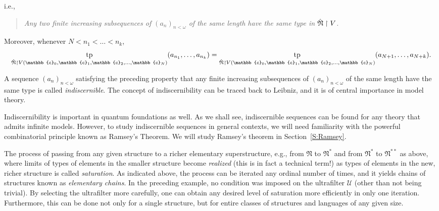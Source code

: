 \documentclass{scrartcl}
\DeclareMathOperator{\tp}{tp}
\begin{document}
\begin{example}
i.e., 
\begin{quote}
\emph{Any two finite increasing subsequences of
$(a_n)_{n<\omega}$ of the same length have the same type in $\Hat{\mathfrak{N}}\upharpoonright V$.}
\end{quote}
Moreover, whenever  $N< n_1<\dots <n_k$,
\[
\tp_{\Hat{\mathfrak{N}}\upharpoonright V(\mathbb{c}_0,\mathbb{c}_1,\mathbb{c}_2,\dots, \mathbb{c}_N)} (a_{n_1}, \dots, a_{n_k})
=
\tp_{\Hat{\mathfrak{N}}\upharpoonright V(\mathbb{c}_0,\mathbb{c}_1,\mathbb{c}_2,\dots, \mathbb{c}_N)} (a_{N+1}, \dots, a_{N+k}).
\]

A sequence $(a_n)_{n<\omega}$ satisfying the preceding property that any finite increasing subsequences of
$(a_n)_{n<\omega}$ of the same length have the same type is called \emph{indiscernible}. The concept of indiscernibility can be traced back to Leibniz, and it is of central importance in model theory. 

Indiscernibility is important in quantum foundations as well. As we shall see, indiscernible sequences can be found for any theory that admits infinite models. However, to study indiscernible sequences in general contexts, we will need familiarity with the powerful combinatorial principle known as Ramsey's Theorem. We will study Ramsey's theorem in Section~\ref{S:Ramsey}.

The process of passing from any given structure to a richer elementary superstructure, e.g., from $\mathfrak{N}$ to $\mathfrak{N}^*$ and from  $\mathfrak{N}^*$ to $\mathfrak{N}^{**}$ as above, where limits of types of elements in the smaller structure become \emph{realized} (this is in fact a technical term!) as types of elements in the new, richer structure is called \emph{saturation}. As indicated above, the process can be iterated any ordinal number of times, and it yields chains of structures known as \emph{elementary chains}. In the preceding example, no condition was imposed on the ultrafilter $\mathscr{U}$ (other than not being trivial). By selecting the ultrafilter more carefully, one can obtain any desired level of saturation more efficiently in only one iteration. Furthermore, this can be done not only for a single structure, but for entire classes of structures and languages of any given size.


\end{example}
\end{document}
